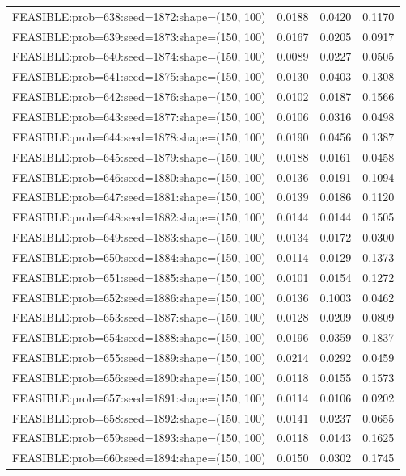\begin{longtable}{lccc}
FEASIBLE:prob=638:seed=1872:shape=(150, 100) & 0.0188 & 0.0420 & 0.1170 \\
FEASIBLE:prob=639:seed=1873:shape=(150, 100) & 0.0167 & 0.0205 & 0.0917 \\
FEASIBLE:prob=640:seed=1874:shape=(150, 100) & 0.0089 & 0.0227 & 0.0505 \\
FEASIBLE:prob=641:seed=1875:shape=(150, 100) & 0.0130 & 0.0403 & 0.1308 \\
FEASIBLE:prob=642:seed=1876:shape=(150, 100) & 0.0102 & 0.0187 & 0.1566 \\
FEASIBLE:prob=643:seed=1877:shape=(150, 100) & 0.0106 & 0.0316 & 0.0498 \\
FEASIBLE:prob=644:seed=1878:shape=(150, 100) & 0.0190 & 0.0456 & 0.1387 \\
FEASIBLE:prob=645:seed=1879:shape=(150, 100) & 0.0188 & 0.0161 & 0.0458 \\
FEASIBLE:prob=646:seed=1880:shape=(150, 100) & 0.0136 & 0.0191 & 0.1094 \\
FEASIBLE:prob=647:seed=1881:shape=(150, 100) & 0.0139 & 0.0186 & 0.1120 \\
FEASIBLE:prob=648:seed=1882:shape=(150, 100) & 0.0144 & 0.0144 & 0.1505 \\
FEASIBLE:prob=649:seed=1883:shape=(150, 100) & 0.0134 & 0.0172 & 0.0300 \\
FEASIBLE:prob=650:seed=1884:shape=(150, 100) & 0.0114 & 0.0129 & 0.1373 \\
FEASIBLE:prob=651:seed=1885:shape=(150, 100) & 0.0101 & 0.0154 & 0.1272 \\
FEASIBLE:prob=652:seed=1886:shape=(150, 100) & 0.0136 & 0.1003 & 0.0462 \\
FEASIBLE:prob=653:seed=1887:shape=(150, 100) & 0.0128 & 0.0209 & 0.0809 \\
FEASIBLE:prob=654:seed=1888:shape=(150, 100) & 0.0196 & 0.0359 & 0.1837 \\
FEASIBLE:prob=655:seed=1889:shape=(150, 100) & 0.0214 & 0.0292 & 0.0459 \\
FEASIBLE:prob=656:seed=1890:shape=(150, 100) & 0.0118 & 0.0155 & 0.1573 \\
FEASIBLE:prob=657:seed=1891:shape=(150, 100) & 0.0114 & 0.0106 & 0.0202 \\
FEASIBLE:prob=658:seed=1892:shape=(150, 100) & 0.0141 & 0.0237 & 0.0655 \\
FEASIBLE:prob=659:seed=1893:shape=(150, 100) & 0.0118 & 0.0143 & 0.1625 \\
FEASIBLE:prob=660:seed=1894:shape=(150, 100) & 0.0150 & 0.0302 & 0.1745 \\

\end{longtable}
